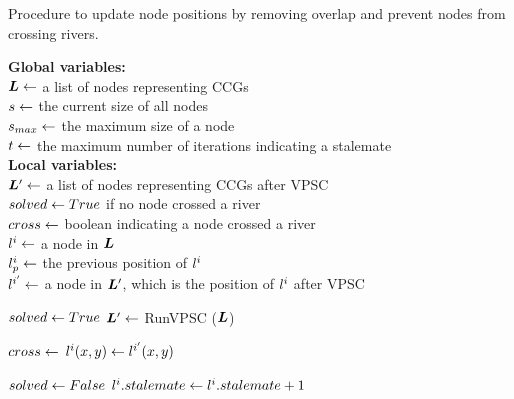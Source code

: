 \begin{algorithm}[tb!]
    \caption{Procedure to update node positions by removing overlap and prevent nodes from crossing rivers.}\label{alg:UpdateNodePosition}
    \textbf{Global variables:} \\
    $ \bm{L} \gets $ a list of nodes representing CCGs \\
    $ s \gets $ the current size of all nodes \\
    $ s_{max} \gets $ the maximum size of a node \\
    $ t \gets $ the maximum number of iterations indicating a stalemate \\

    \textbf{Local variables:} \\
    $ \bm{L}' \gets $ a list of nodes representing CCGs after VPSC \\
    $ solved \gets True $ if no node crossed a river \\
    $ cross \gets $ boolean indicating a node crossed a river \\
    $ l^i \gets $ a node in $ \bm{L} $ \\
    $ l^i_{p} \gets $ the previous position of $ l^i $\\
    $ l^{i'} \gets $ a node in $ \bm{L}' $, which is the position of $ l^i $ after VPSC \\

    \begin{algorithmic}[1]
        \While{$ \nodeSize < \nodeSizeMax $}


                \State $ solved \gets True $
                \State $ \bm{L}' \gets $ RunVPSC ($ \bm{L} $)

                \ForEach {$ \nodeListVPSCEach \in \nodeListVPSC $}


                        \State $ cross \gets $ 
                        \State $ l^i(x,y) \gets l^{i'}(x,y) $


                            \State $ solved \gets False $
                            \State $ l^i.stalemate \gets l^i.stalemate + 1 $


\end{algorithmic}
\end{algorithm}
